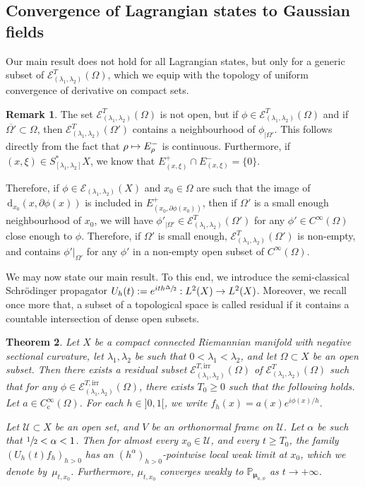 \documentclass[10pt]{amsart}
\let\mathcal\mathscr
\newcommand\mto{\mathchoice{\longmapsto}{\mapsto}{\mapsto}{\mapsto}}
\newcommand{\rc}{\mathrm{c}}
\newcommand{\rd}{\,\mathrm{d}}
\newcommand{\irr}{\mathrm{irr}}
\theoremstyle{plain}
\newtheorem{theorem}{Theorem}[section]
\theoremstyle{definition}
\newtheorem{remark}[theorem]{Remark}
\begin{document}
\subsection{Convergence of Lagrangian states to Gaussian fields}
Our main result does not hold for all Lagrangian states, but only for a generic subset of $\mathcal{E}^{T}_{(\lambda_1,\lambda_2)}(\Omega)$, which we equip with the topology of uniform convergence of derivative on compact sets.

\begin{remark}\label{rem:NonEmpty}
The set $\mathcal{E}^T_{(\lambda_1,\lambda_2)}(\Omega)$ is not open, but if $\phi \in \mathcal{E}_{(\lambda_1,\lambda_2)}^T(\Omega)$ and if $\overline{\Omega'} \subset \Omega$, then $ \mathcal{E}_{(\lambda_1,\lambda_2)}^T(\Omega')$ contains a neighbourhood of $\phi_{|\Omega'}$. This follows directly from the fact that $\rho\mto E_\rho^-$ is continuous. Furthermore, if $(x,\xi)\in S_{[\lambda_1,\lambda_2]}^*X$, we know that $E_{(x,\xi)}^+\cap E_{(x,\xi)}^-= \{0\}$.

Therefore, if $\phi \in \mathcal{E}_{(\lambda_1,\lambda_2)}(X)$ and $x_0\in \Omega$ are such that the image of $\rd _{x_0} (x, \partial \phi(x))$ is included in $E_{(x_0, \partial \phi(x_0))}^+$, then if $\Omega'$ is a small enough neighbourhood of $x_0$, we will have $\phi'_{|\Omega'} \in \mathcal{E}^T_{(\lambda_1,\lambda_2)}(\Omega')$ for any $\phi'\in C^\infty(\Omega)$ close enough to $\phi$. Therefore, if $\Omega'$ is small enough, $\mathcal{E}^T_{(\lambda_1,\lambda_2)}(\Omega')$ is non-empty, and contains $\phi'|_{\Omega'}$ for any $\phi'$ in a non-empty open subset of $C^\infty(\Omega)$.
\end{remark}

We may now state our main result. To this end, we introduce the semi-classical Schrödinger propagator $U_h(t):=e^{ith\sfrac{\Delta}{2}}:L^2(X)\to L^2(X)$. Moreover, we recall once more that, a subset of a topological space is called residual if it contains a countable intersection of dense open subsets.


\begin{theorem}\label{th:Pointwise}
Let $X$ be a compact connected Riemannian manifold with negative sectional curvature, let $\lambda_1,\lambda_2$ be such that $0<\lambda_1<\lambda_2$, and let $\Omega\subset X$ be an open subset. Then there exists a residual subset $\mathcal{E}^{T,\irr}_{(\lambda_1,\lambda_2)}(\Omega)$ of $\mathcal{E}^T_{(\lambda_1,\lambda_2)}(\Omega)$ such that for any $\phi\in \mathcal{E}^{T,\irr}_{(\lambda_1,\lambda_2)}(\Omega)$, there exists $T_0\geq 0$ such that the following holds. Let $a\in C_\rc^\infty(\Omega)$. For each $h\in{}]0,1[$, we write $f_h(x)=a(x)e^{i\phi(x)/h}$.

Let $\mathcal{U}\subset X$ be an open set, and $V$ be an orthonormal frame on $\mathcal{U}$. Let $\alpha$ be such that $\sfrac{1}{2}<\alpha<1$. Then for almost every $x_0\in \mathcal{U}$, and every $t\geq T_0$, the family $(U_h(t) f_h)_{h>0}$ has an $(h^\alpha)_{h>0}$-pointwise local weak limit at $x_0$, which we denote by~$\mu_{t,x_0}$. Furthermore, $\mu_{t,x_0}$ converges weakly to $\mathbb{P}_{\boldsymbol{\mu}_{a, \phi}}$ as $t\to +\infty$.
\end{theorem}
\end{document}
